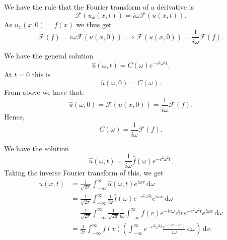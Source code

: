 \begin{derivation}
  We have the rule that the Fourier transform of a derivative is
  \begin{equation*}
    \mathcal{F}(u_x(x,t)) = i \omega \mathcal{F}\left( u \left( x,t \right) \right)
  .\end{equation*}
  As $u_x (x,0) = f(x)$ we thus get
  \begin{equation*}
    \mathcal{F}\left( f \right) = i \omega \mathcal{F}(u (x,0)) \implies \mathcal{F}\left( u(x,0) \right) = \frac{1}{i \omega} \mathcal{F}(f)
  .\end{equation*}
  
  We have the general solution
  \begin{equation*}
    \hat{u} (\omega, t) = C (\omega) e^{-c^2 \omega^2 t}
  .\end{equation*}
  At $t = 0$ this is
  \begin{equation*}
    \hat{u} (\omega,0) = C(\omega)
  .\end{equation*}
  From above we have that:
  \begin{equation*}
    \hat{u}(\omega, 0) = \mathcal{F}(u(x,0)) = \frac{1}{i \omega} \mathcal{F}(f)
  .\end{equation*}
  Hence,
  \begin{equation*}
    C(\omega) = \frac{1}{i \omega} \mathcal{F}(f)
  .\end{equation*}
  

  We have the solution
  \begin{equation*}
    \hat{u} (\omega, t) = \frac{1}{i\omega} \hat{f}(\omega) e^{-c^2 \omega^2 t}
  .\end{equation*}
  Taking the inverse Fourier transform of this, we get
  \begin{align*}
    u(x,t) &= \frac{1}{\sqrt{2\pi}} \int_{-\infty}^{\infty} \hat{u}(\omega, t) e^{i\omega x} \, \mathrm{d}\omega \\
    &= \frac{1}{\sqrt{2\pi}} \int_{-\infty}^{\infty} \frac{1}{i\omega} \hat{f}(\omega) e^{-c^2 \omega^2 t} e^{i \omega x} \, \mathrm{d}\omega \\
    &= \frac{1}{\sqrt{2\pi}} \int_{-\infty}^{\infty} \frac{1}{\sqrt{2\pi}}\frac{1}{i\omega} \int_{-\infty}^{\infty} f(v) e^{-iv\omega} \, \mathrm{d}v e^{-c^2 \omega^2 t} e^{i\omega x} \, \mathrm{d}\omega \\
    &= \frac{1}{2\pi} \int_{-\infty}^{\infty} f(v) \left( \int_{-\infty}^{\infty} e^{-c^2 \omega^2 t} \frac{e^{i \left( \omega x - \omega v \right)}}{i\omega} \, \mathrm{d}\omega \right) \, \mathrm{d}v
  .\end{align*}


\end{derivation}
